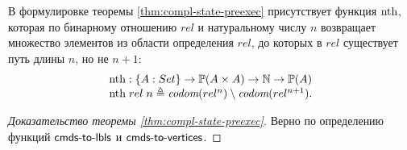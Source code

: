 В формулировке теоремы \ref{thm:compl-state-preexec}
присутствует функция $\mathrm{nth}$, которая по бинарному отношению $rel$ и натуральному числу $n$ возвращает множество элементов
из области определения $rel$, до которых в $rel$ существует путь длины $n$, но не $n+1$:
\[\inarr{
  \nthf : \{A : Set\} \rightarrow \Pset(A \times A) \rightarrow \mathbb{N} \rightarrow \Pset(A) \\
  \nthf \; rel \; n \defeq \codom{rel^{n}} \setminus \codom{rel^{n + 1}}.
}\]

\begin{proof}[Доказательство теоремы \ref{thm:compl-state-preexec}]
  Верно по определению функций $\textup{\sf cmds-to-lbls}$ и $\textup{\sf cmds-to-vertices}$.
\end{proof}
